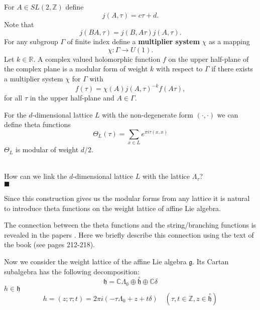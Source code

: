 \documentclass[a4paper,12pt]{article}
\newenvironment{comment}
{\par\noindent{\bf Comment}\\}
{\\\hfill$\scriptstyle\blacksquare$\par}
\theoremstyle{definition} \newtheorem{Def}{Definition}
\newcommand{\co}[1]{\overset{\circ }{#1}}
\begin{document}
For $A\in SL(2,\mathbb{Z})$ define
\begin{equation}
  \label{eq:13}
  j(A,\tau)=c\tau+d.
\end{equation}
Note that
\begin{equation}
  \label{eq:14}
  j(BA,\tau)=j(B,A\tau)j(A,\tau).
\end{equation}
For any subgroup $\Gamma$ of finite index define a {\bf multiplier system} $\chi$ as a mapping
\begin{equation}
  \label{eq:15}
  \chi:\Gamma\to U(1).
\end{equation}
Let $k\in \mathbb{R}$. A complex valued holomorphic function $f$ on the upper half-plane of the complex plane is a modular form of weight $k$ with respect to $\Gamma$ if there exists a multiplier system $\chi$ for $\Gamma$ with
\begin{equation}
  \label{eq:16}
  f(\tau)=\chi(A) j(A,\tau)^{-k} f(A\tau),
\end{equation}
for all $\tau$ in the upper half-plane and $A\in \Gamma$.


For the $d$-dimensional lattice $L$ with the non-degenerate form $(\cdot,\cdot)$ we can define theta functions
\begin{equation}
  \label{eq:8}
  \Theta_L (\tau)=\sum_{x\in L}e^{\pi i \tau (x,x)}
\end{equation}
$\Theta_L$ is modular of weight $d/2$.

\begin{comment}
  How can we link the $d$-dimensional lattice $L$ with the lattice $\Lambda_{\tau}$?
\end{comment}

Since this construction gives us the modular forms from any lattice it is natural to introduce theta functions on the weight lattice of affine Lie algebra.

The connection between the theta functions and the string/branching functions is revealed in the papers \cite{kac1984infinite,kac1988modular}. Here we briefly describe this connection using the text of the book \cite{kass1990ala} (see pages 212-218).

Now we consider the weight lattice of the affine Lie algebra $\mathfrak{g}$.
Its Cartan subalgebra has the following decomposition:
\begin{equation}
  \label{eq:6}
  \mathfrak{h}=\mathbb{C}\Lambda_0\oplus \co{\mathfrak{h}}\oplus \mathbb{C}\delta
\end{equation}
$h\in \mathfrak{h}$
\begin{equation}
  \label{eq:7}
  h=(z;\tau;t)=2\pi i (-\tau \Lambda_0 +z + t\delta)\quad (\tau,t\in \mathbb{Z}, z\in \co{\mathfrak{h}})
\end{equation}
\end{document}
